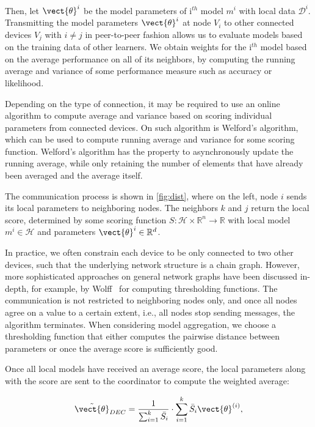 Then, let $\vect{\theta}^{i}$ be the model parameters of i$^{th}$ model $m^{i}$ with local data $\mathcal{D}^{i}$.
Transmitting the model parameters $\vect{\theta}^{i}$  at node $V_i$  to other connected devices  $V_j$ with $i \neq j$ in peer-to-peer fashion allows us to evaluate models based on the training data of other learners.
We obtain weights for the i$^{th}$ model based on the average performance on all of its neighbors, by computing the running average and variance of some performance measure such as accuracy or likelihood.

Depending on the type of connection, it may be required to use an online algorithm to compute average and variance based on scoring individual parameters from connected devices.
On such algorithm is Welford's algorithm, which can be used to compute running average and variance for some scoring function.
Welford's algorithm has the property to asynchronously update the running average, while only retaining the number of elements that have already been averaged and the average itself.

The communication process is shown in  \autoref{fig:dist}, where on the left, node $i$ sends its local parameters to neighboring nodes. The neighbors $k$ and $j$ return the local score, determined by some scoring function $S: \mathcal{H} \times \mathbb{R}^n \rightarrow \mathbb{R}$ with local model $m^{i} \in \mathcal{H}$ and parameters $\vect{\theta}^{i} \in \mathbb{R}^d$.



In practice, we often constrain each device to be only connected to two other devices, such that the underlying network structure is a chain graph.
However, more sophisticated approaches on general network graphs have been discussed in-depth, for example, by Wolff~\cite{wolff2013local} for computing thresholding functions.
The communication is not restricted to neighboring nodes only, and once all nodes agree on a value to a certain extent, i.e., all nodes stop sending messages, the algorithm terminates.
When considering model aggregation, we choose a thresholding function that either computes the pairwise distance between parameters or once the average score is sufficiently good.

Once all local models have received an average score, the local parameters along with the score are sent to the coordinator to compute the weighted average:

\begin{equation}
    \label{eq:scorenorm}
    \tilde{\vect{\theta}}_{DEC} = \frac{1}{\sum_{i=1}^k \bar{S_i}} \cdot \sum_{i=1}^k \bar{S}_i \vect{\theta}^{(i)},
\end{equation}

